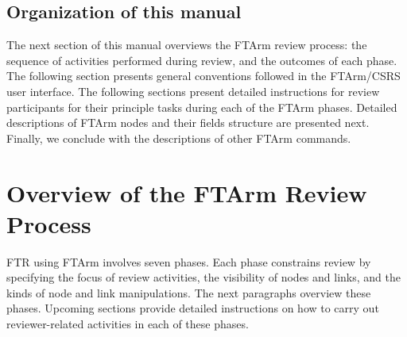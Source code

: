 \subsection {Organization of this manual}
The next section of this manual overviews the FTArm review
process: the sequence of activities performed during review, and the
outcomes of each phase.
The following section presents general conventions followed in the
FTArm/CSRS user interface. The following sections present detailed
instructions for review participants for their principle tasks during
each of the FTArm phases. Detailed descriptions of FTArm nodes
and their fields structure are presented next.
Finally, we conclude with the descriptions of other FTArm commands. 

\section {Overview of the FTArm Review Process}
FTR using FTArm involves seven phases.
Each phase constrains review by specifying the focus of
review activities, the visibility of nodes and links, and the kinds of
node and link manipulations. 
The next paragraphs overview these phases. Upcoming sections provide
detailed instructions on how to carry out reviewer-related activities
in each of these phases.
